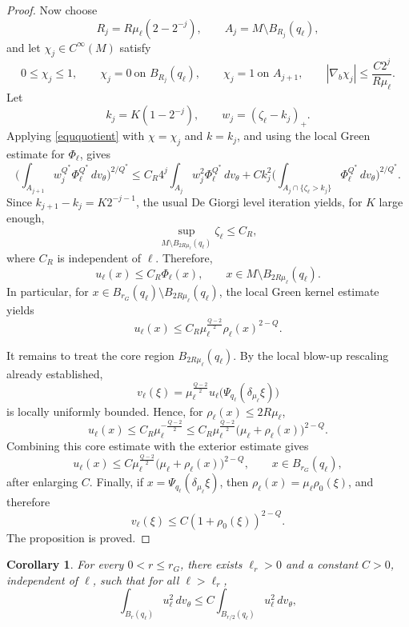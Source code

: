 \documentclass[11pt]{article}
\numberwithin{equation}{section}
\newtheorem{corollary}{Corollary}[section]
\numberwithin{equation}{section}
\begin{document}
\begin{proof}
		Now choose
		\[
		R_j=R\mu_\ell(2-2^{-j}),\qquad A_j=M\setminus B_{R_j}(q_\ell),
		\]
		and let \(\chi_j\in C^\infty(M)\) satisfy
		\[
		0\le\chi_j\le1,\qquad \chi_j=0\ \text{on }B_{R_j}(q_\ell),\qquad \chi_j=1\ \text{on }A_{j+1}, \qquad |\nabla_b\chi_j|\le \frac{C2^j}{R\mu_\ell}.
		\]
		Let
		\[
		k_j=K(1-2^{-j}),\qquad w_j=(\zeta_\ell-k_j)_+.
		\]
		Applying \eqref{eququotient} with \(\chi=\chi_j\) and \(k=k_j\), and using the local Green estimate for \(\Phi_\ell\), gives
		\[
		\Big( \int_{A_{j+1}}w_j^{Q^*}\Phi_\ell^{Q^*}\,dv_\theta \Big)^{2/Q^*} \le C_R4^j\int_{A_j}w_j^2\Phi_\ell^{Q^*}\,dv_\theta + Ck_j^2 \Big( \int_{A_j\cap\{\zeta_\ell>k_j\}}\Phi_\ell^{Q^*}\,dv_\theta \Big)^{2/Q^*}.
		\]
		Since \(k_{j+1}-k_j=K2^{-j-1}\), the usual De Giorgi level iteration yields, for \(K\) large enough,
		\[
		\sup_{M\setminus B_{2R\mu_\ell}(q_\ell)}\zeta_\ell\le C_R,
		\]
		where \(C_R\) is independent of \(\ell\).  Therefore,
		\[
		u_\ell(x)\le C_R\Phi_\ell(x), \qquad x\in M\setminus B_{2R\mu_\ell}(q_\ell).
		\]
		In particular, for \(x\in B_{r_G}(q_\ell)\setminus B_{2R\mu_\ell}(q_\ell)\), the local Green kernel estimate yields
		\[
		u_\ell(x) \le C_R\mu_\ell^{\frac{Q-2}{2}}\rho_\ell(x)^{2-Q}.
		\]
		
		It remains to treat the core region \(B_{2R\mu_\ell}(q_\ell)\). By the local blow-up rescaling already established,
		\[
		v_\ell(\xi) = \mu_\ell^{\frac{Q-2}{2}} u_\ell\bigl(\Psi_{q_\ell}(\delta_{\mu_\ell}\xi)\bigr)
		\]
		is locally uniformly bounded. Hence, for \(\rho_\ell(x)\le2R\mu_\ell\),
		\[
		u_\ell(x) \le C_R\mu_\ell^{-\frac{Q-2}{2}} \le C_R \mu_\ell^{\frac{Q-2}{2}} \bigl(\mu_\ell+\rho_\ell(x)\bigr)^{2-Q}.
		\]
		Combining this core estimate with the exterior estimate gives
		\[
		u_\ell(x) \le C \mu_\ell^{\frac{Q-2}{2}} \bigl(\mu_\ell+\rho_\ell(x)\bigr)^{2-Q}, \qquad x\in B_{r_G}(q_\ell),
		\]
		after enlarging \(C\). Finally, if \(x=\Psi_{q_\ell}(\delta_{\mu_\ell}\xi)\), then \(\rho_\ell(x)=\mu_\ell\rho_0(\xi)\), and therefore
		\[
		v_\ell(\xi) \le C(1+\rho_0(\xi))^{2-Q}.
		\]
		The proposition is proved.
	\end{proof}
	
	\begin{corollary}\label{estimatering}
		For every \(0 < r \le r_G\), there exists  \(\ell_r>0\) and a constant \(C>0\), independent of \(\ell\), such that for all \(\ell>\ell_r\),
		\[
		\int_{B_{r}(q_\ell)} u_\ell^2\,dv_\theta \le C\int_{B_{r/2}(q_\ell)} u_\ell^2\,dv_\theta,
		\]
	\end{corollary}
	
\end{document}
